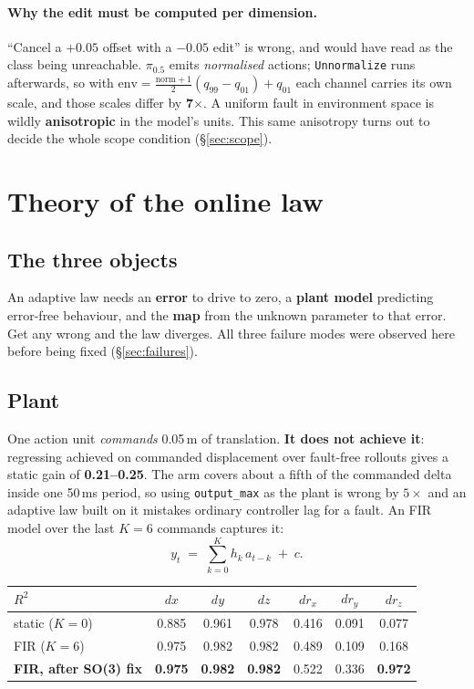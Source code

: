 \documentclass[11pt,a4paper]{article}
\newcommand{\code}[1]{\texttt{\small #1}}
\begin{document}
\paragraph{Why the edit must be computed per dimension.} ``Cancel a $+0.05$
offset with a $-0.05$ edit'' is wrong, and would have read as the class being
unreachable. $\pi_{0.5}$ emits \emph{normalised} actions;
\code{Unnormalize} runs afterwards, so with
$\mathrm{env} = \tfrac{\mathrm{norm}+1}{2}(q_{99}-q_{01}) + q_{01}$ each channel
carries its own scale, and those scales differ by \textbf{7$\times$}. A uniform
fault in environment space is wildly \textbf{anisotropic} in the model's units.
This same anisotropy turns out to decide the whole scope condition
(\S\ref{sec:scope}).

\section{Theory of the online law}

\subsection{The three objects}

An adaptive law needs an \textbf{error} to drive to zero, a \textbf{plant model}
predicting error-free behaviour, and the \textbf{map} from the unknown parameter
to that error. Get any wrong and the law diverges. All three failure modes were
observed here before being fixed (\S\ref{sec:failures}).

\subsection{Plant}

One action unit \emph{commands} 0.05\,m of translation. \textbf{It does not
achieve it}: regressing achieved on commanded displacement over fault-free
rollouts gives a static gain of \textbf{0.21--0.25}. The arm covers about a fifth
of the commanded delta inside one 50\,ms period, so using \code{output\_max} as
the plant is wrong by $5\times$ and an adaptive law built on it mistakes ordinary
controller lag for a fault. An FIR model over the last $K=6$ commands captures it:
\begin{equation}
y_t \;=\; \sum_{k=0}^{K} h_k\, a_{t-k} \;+\; c .
\end{equation}

\begin{center}
\begin{tabular}{lcccccc}
\toprule
$R^2$ & $dx$ & $dy$ & $dz$ & $d r_x$ & $d r_y$ & $d r_z$ \\
\midrule
static ($K=0$)       & 0.885 & 0.961 & 0.978 & 0.416 & 0.091 & 0.077 \\
FIR ($K=6$)          & 0.975 & 0.982 & 0.982 & 0.489 & 0.109 & 0.168 \\
\textbf{FIR, after SO(3) fix} & \textbf{0.975} & \textbf{0.982} & \textbf{0.982} & 0.522 & 0.336 & \textbf{0.972} \\
\bottomrule
\end{tabular}
\end{center}
\end{document}
